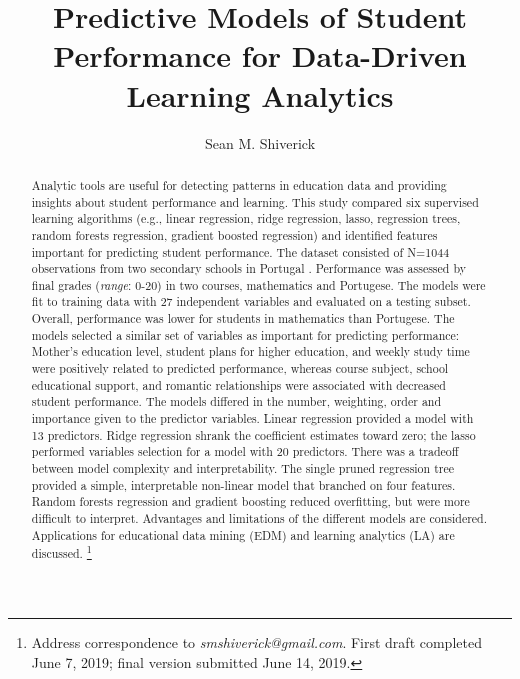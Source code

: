 \documentclass[sigconf]{acmart}
\begin{document}
  \title{Predictive Models of Student Performance for Data-Driven 
  Learning Analytics}
  \author{Sean M. Shiverick}
\renewcommand{\shortauthors}{S.M. Shiverick}


\begin{abstract}

Analytic tools are useful for detecting patterns in education data and 
providing insights about student performance and learning. This study compared 
six supervised learning algorithms (e.g., linear regression, ridge regression, 
lasso, regression trees, random forests regression, gradient boosted regression) 
and identified features important for predicting student performance. The 
dataset consisted of N=1044 observations from two secondary schools in 
Portugal \cite{cortez08}. Performance was assessed by final grades 
(\textit{range}: 0-20) in two courses, mathematics and Portugese. The models 
were fit to training data with 27 independent variables and evaluated on a 
testing subset. Overall, performance was lower for students in mathematics 
than Portugese. The models selected a similar set of variables as important 
for predicting performance: Mother's education level, student plans for higher 
education, and weekly study time were positively related to predicted 
performance, whereas course subject, school educational support, and romantic 
relationships were associated with decreased student performance. The models 
differed in the number, weighting, order and importance given to the predictor 
variables. Linear regression provided a model with 13 predictors. Ridge 
regression shrank the coefficient estimates toward zero; the lasso performed 
variables selection for a model with 20 predictors. There was a tradeoff 
between model complexity and interpretability. The single pruned regression 
tree provided a simple, interpretable non-linear model that branched on four 
features. Random forests regression and gradient boosting reduced overfitting, 
but were more difficult to interpret. Advantages and limitations of the 
different models are considered. Applications for educational data mining (EDM) 
and learning analytics (LA) are discussed. 
\footnote{Address correspondence to \textit{smshiverick@gmail.com}.
First draft completed June 7, 2019; final version submitted June 14, 2019.}

\end{abstract}
\maketitle
\end{document}
